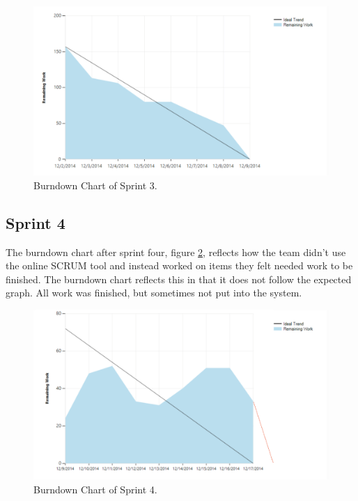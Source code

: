\begin{figure}[H]
	\centering
	\includegraphics[width=\textwidth]{Figures/Burndown3}
	\caption{Burndown Chart of Sprint 3.}
	\label{fig:burndown3}
\end{figure}

\subsection{Sprint 4}
The burndown chart after sprint four, figure \ref{fig:burndown4}, reflects how the team didn't use the online SCRUM tool and instead worked on items they felt needed work to be finished. The burndown chart reflects this in that it does not follow the expected graph. All work was finished, but sometimes not put into the system.\\

\begin{figure}[H]
	\centering
	\includegraphics[width=\textwidth]{Figures/Burndown4}
	\caption{Burndown Chart of Sprint 4.}
	\label{fig:burndown4}
\end{figure}
